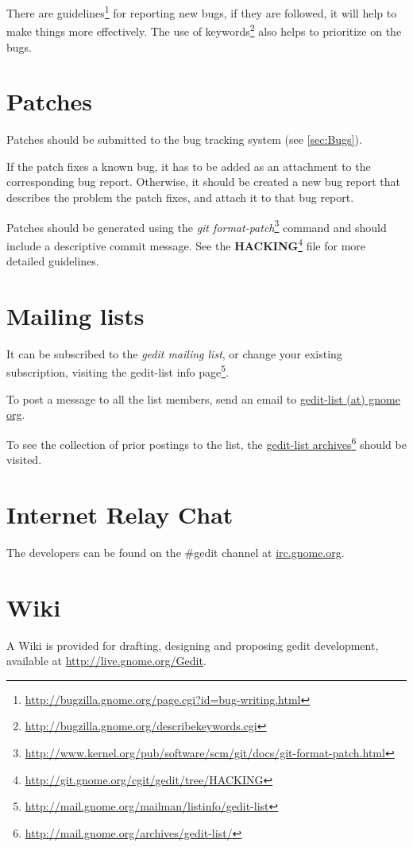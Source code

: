 There are guidelines\footnote{\url{http://bugzilla.gnome.org/page.cgi?id=bug-writing.html}} for reporting new bugs, if they are followed, it will help to make things more effectively. The use of keywords\footnote{\url{http://bugzilla.gnome.org/describekeywords.cgi}} also helps to prioritize on the bugs.

\section{Patches}\label{sec:Patches}

Patches should be submitted to the bug tracking system (see \ref{sec:Bugs}).

If the patch fixes a known bug, it has to be added as an attachment to the corresponding bug report. Otherwise, it should be created a new bug report that describes the problem the patch fixes, and attach it to that bug report.

Patches should be generated using the \textit{git format-patch}\footnote{\url{http://www.kernel.org/pub/software/scm/git/docs/git-format-patch.html}} command and should include a descriptive commit message. See the \textbf{HACKING}\footnote{\url{http://git.gnome.org/cgit/gedit/tree/HACKING}} file for more detailed guidelines.

\section{Mailing lists}\label{sec:Mailing}

It can be subscribed to the \emph{gedit mailing list}, or change your existing subscription, visiting the gedit-list info page\footnote{\url{http://mail.gnome.org/mailman/listinfo/gedit-list}}.

To post a message to all the list members, send an email to \href{mailto:gedit-list@gnome org}{gedit-list (at) gnome org}.

To see the collection of prior postings to the list, the \href{http://mail.gnome.org/archives/gedit-list/}{gedit-list archives}\footnote{\url{http://mail.gnome.org/archives/gedit-list/}} should be visited.

\section{Internet Relay Chat}\label{sec:IRC}

The developers can be found on the \#gedit channel at \url{irc.gnome.org}.

\section{Wiki}\label{sec:Wiki}

A Wiki is provided for drafting, designing and proposing gedit development, available at \url{http://live.gnome.org/Gedit}.

